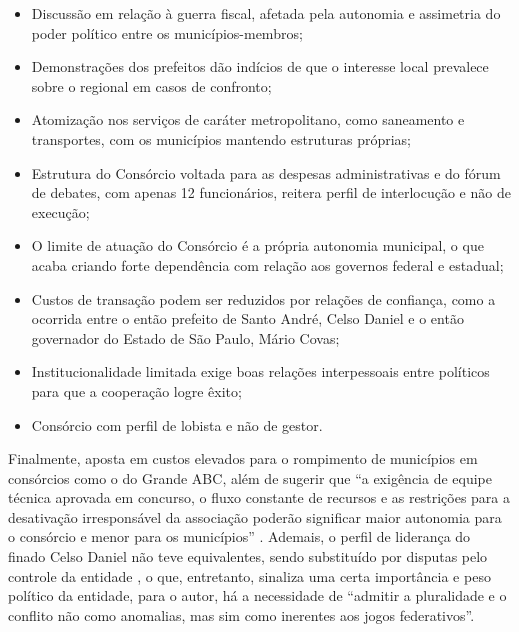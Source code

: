\documentclass[
article,			%
11pt,				%
oneside,			%
a4paper,			%
english,			%
brazil,				%
sumario=tradicional
]{abntex2}
\begin{document}
\begin{itemize}
		\item Discussão em relação à guerra fiscal, afetada pela autonomia e assimetria do poder político entre os municípios-membros;
		\item Demonstrações dos prefeitos dão indícios de que o interesse local prevalece sobre o regional em casos de confronto;
		\item Atomização nos serviços de caráter metropolitano, como saneamento e transportes, com os municípios mantendo estruturas próprias;
		\item Estrutura do Consórcio voltada para as despesas administrativas e do fórum de debates, com apenas 12 funcionários, reitera perfil de interlocução e não de execução;
		\item O limite de atuação do Consórcio é a própria autonomia municipal, o que acaba criando forte dependência com relação aos governos federal e estadual;
		\item Custos de transação podem ser reduzidos por relações de confiança, como a ocorrida entre o então prefeito de Santo André, Celso Daniel e o então governador do Estado de São Paulo, Mário Covas;
		\item Institucionalidade limitada exige boas relações interpessoais entre políticos para que a cooperação logre êxito;
		\item Consórcio com perfil de lobista e não de gestor.
	\end{itemize}
	
	Finalmente,  aposta em custos elevados para o rompimento de municípios em consórcios como o do Grande ABC, além de sugerir que ``a exigência de equipe técnica aprovada em concurso, o fluxo constante de recursos e as restrições para a desativação irresponsável da associação poderão significar maior autonomia para o consórcio e menor para os municípios'' \cite[p. 116]{machado2009}. Ademais, o perfil de liderança do finado Celso Daniel não teve equivalentes, sendo substituído por disputas pelo controle da entidade \cite[p. 116]{machado2009}, o que, entretanto, sinaliza uma certa importância e peso político  da entidade, para o autor, há a necessidade de ``admitir a pluralidade e o conflito não como anomalias, mas sim como inerentes aos jogos federativos''.
	
	
	\postextual
	
\end{document}
